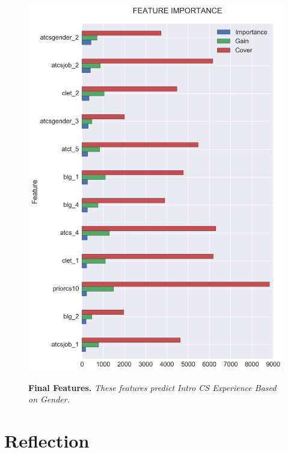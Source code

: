 \begin{figure}[!hbtp]
\centering

    \caption{\textbf{Final Features. }\textit{These features predict Intro CS Experience Based on Gender.}}

    \includegraphics[width=1\textwidth]{figures/final_importance.png}
    \label{targetClass}
\end{figure}


\section*{Reflection}


